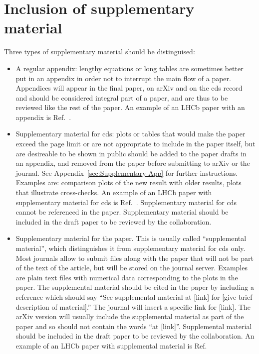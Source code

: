 \section{Inclusion of supplementary material}
\label{sec:Supplementary}

Three types of supplementary material should be distinguised:
\begin{itemize}
\item{A regular appendix: lengthy equations or long tables are sometimes
better put in an appendix in order not to interrupt the main flow of a paper.
Appendices will appear in the final paper, on arXiv
and on the cds record and should be considered integral
part of a paper, and are thus to be reviewed like the rest of the paper.
An example of an LHCb paper with an appendix is Ref.~\cite{LHCb-PAPER-2013-070}.
}
\item{Supplementary material for cds: plots or tables that 
would make the paper exceed the page limit or are
not appropriate to include in the paper itself,
but are desireable to be shown in public
should be added to the paper drafts in an appendix, and
removed from the paper before submitting to arXiv or the journal.
See Appendix~\ref{sec:Supplementary-App} for further instructions.
Examples are: comparison plots of the new result with older results,
plots that illustrate cross-checks.
An example of an LHCb paper with supplementary material for cds 
is Ref.~\cite{LHCb-PAPER-2013-035}.
Supplementary material for cds cannot be referenced in the paper.
Supplementary material should be included in the draft paper to be
reviewed by the collaboration.
}
\item{Supplementary material for the paper. This is usually called ``supplemental material'', which distinguishes it from supplementary material for cds only. Most journals allow
to submit files along with the paper that will not be part of the
text of the article, but will be stored on the journal server.
Examples are plain text files with numerical data corresponding to the plots
in the paper. 
The supplemental material should be cited in the paper by including a reference
which should say ``See supplemental material at [link] for [give brief description of material].''
The journal will insert a specific link for [link]. The arXiv version will usually include the supplemental material as part of the paper and so should not contain the words ``at [link]''.
Supplemental material should be included in the draft paper to be
reviewed by the collaboration.
An example of an LHCb paper with supplemental material 
is Ref.~\cite{LHCb-PAPER-2015-029}
}
\end{itemize}

